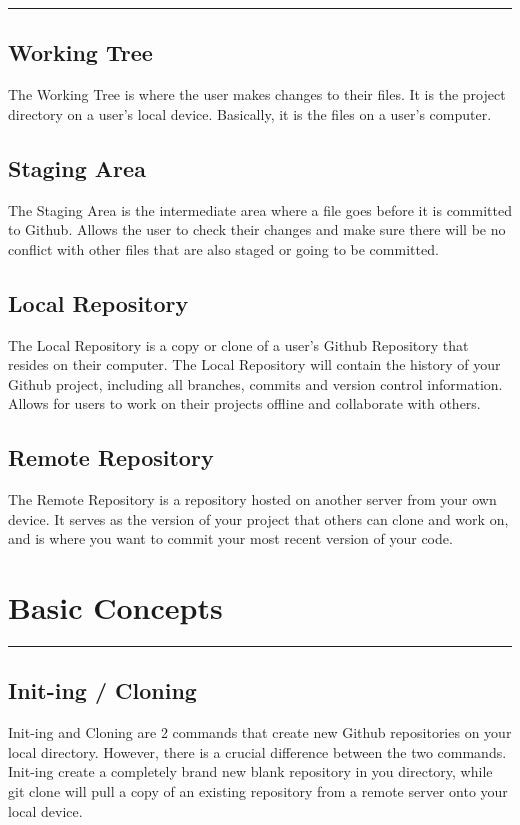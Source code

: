 \documentclass{article}
\begin{document}
\vspace{15pt}
\hrule

\subsection*{Working Tree}
The Working Tree is where the user makes changes to their files. It is the project directory on a user's local device. Basically, it is the files on a user's computer.
\vspace{15pt}

\subsection*{Staging Area}
The Staging Area is the intermediate area where a file goes before it is committed to Github. Allows the user to check their changes and make sure there will be no conflict with other files that are also staged or going to be committed.
\vspace{15pt}

\subsection*{Local Repository}
The Local Repository is a copy or clone of a user's Github Repository that resides on their computer. The Local Repository will contain the history of your Github project, including all branches, commits and version control information. Allows for users to work on their projects offline and collaborate with others.
\vspace{15pt}

\subsection*{Remote Repository}
The Remote Repository is a repository hosted on another server from your own device. It serves as the version of your project that others can clone and work on, and is where you want to commit your most recent version of your code.
\vspace{5pt}

\section*{Basic Concepts}
\hrule
\vspace{25pt}
\subsection*{Init-ing / Cloning}
Init-ing and Cloning are 2 commands that create new Github repositories on your local directory. However, there is a crucial difference between the two commands. Init-ing create a completely brand new blank repository in you directory, while git clone will pull a copy of an existing repository from a remote server onto your local device. 
\end{document}
